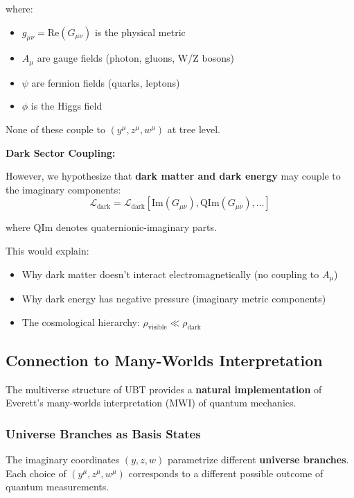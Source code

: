 where:
\begin{itemize}
\item $g_{\mu\nu} = \text{Re}(G_{\mu\nu})$ is the physical metric
\item $A_{\mu}$ are gauge fields (photon, gluons, W/Z bosons)
\item $\psi$ are fermion fields (quarks, leptons)
\item $\phi$ is the Higgs field
\end{itemize}

None of these couple to $(y^{\mu}, z^{\mu}, w^{\mu})$ at tree level.

\textbf{Dark Sector Coupling:}

However, we hypothesize that \textbf{dark matter and dark energy} may couple to the imaginary components:
\begin{equation}
\mathcal{L}_{\text{dark}} = \mathcal{L}_{\text{dark}}[\text{Im}(G_{\mu\nu}), \text{QIm}(G_{\mu\nu}), \dots]
\end{equation}

where $\text{QIm}$ denotes quaternionic-imaginary parts.

This would explain:
\begin{itemize}
\item Why dark matter doesn't interact electromagnetically (no coupling to $A_{\mu}$)
\item Why dark energy has negative pressure (imaginary metric components)
\item The cosmological hierarchy: $\rho_{\text{visible}} \ll \rho_{\text{dark}}$
\end{itemize}

\subsection{Connection to Many-Worlds Interpretation}

The multiverse structure of UBT provides a \textbf{natural implementation} of Everett's many-worlds interpretation (MWI) of quantum mechanics.

\subsubsection{Universe Branches as Basis States}

The imaginary coordinates $(y, z, w)$ parametrize different \textbf{universe branches}. Each choice of $(y^{\mu}, z^{\mu}, w^{\mu})$ corresponds to a different possible outcome of quantum measurements.

